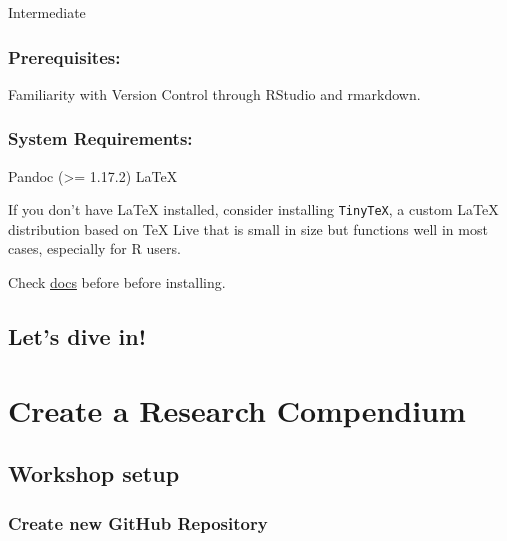\documentclass[
  letterpaper,
  DIV=11,
  numbers=noendperiod]{scrreprt}
\begin{document}
Intermediate

\hypertarget{prerequisites-1}{%
\subsection*{Prerequisites:}\label{prerequisites-1}}

Familiarity with Version Control through RStudio and rmarkdown.

\hypertarget{system-requirements-1}{%
\subsection*{System Requirements:}\label{system-requirements-1}}

Pandoc (\textgreater= 1.17.2) LaTeX

If you don't have LaTeX installed, consider installing \texttt{TinyTeX},
a custom LaTeX distribution based on TeX Live that is small in size but
functions well in most cases, especially for R users.

Check \href{https://yihui.name/tinytex/}{docs} before before installing.

\hypertarget{lets-dive-in}{%
\section*{Let's dive in!}\label{lets-dive-in}}


\hypertarget{create-a-research-compendium-1}{%
\chapter{Create a Research
Compendium}\label{create-a-research-compendium-1}}

\hypertarget{workshop-setup}{%
\section{Workshop setup}\label{workshop-setup}}

\hypertarget{create-new-github-repository}{%
\subsection{Create new GitHub
Repository}\label{create-new-github-repository}}
\end{document}
